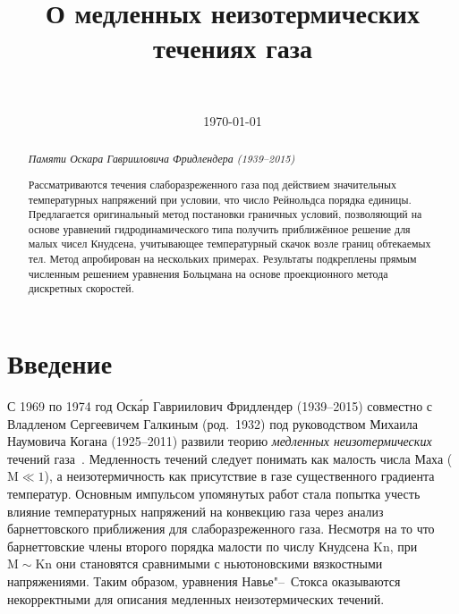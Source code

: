 \documentclass[
aps,%
12pt,%
final,%
notitlepage,%
oneside,%
onecolumn,%
nobibnotes,%
nofootinbib,%
superscriptaddress,%
noshowpacs,%
centertags]%
{revtex4}
\newcommand{\Kn}{\mathrm{Kn}}
\newcommand{\Ma}{\mathrm{M}}
\begin{document}

\title{О медленных неизотермических течениях газа}
\author{~}

\date{\today}

\begin{abstract}
    \begin{flushright}
    \vspace{1em}
    {\it Памяти Оскара Гаврииловича Фридлендера (1939--2015)}
    \vspace{1em}
    \end{flushright}
    Рассматриваются течения слаборазреженного газа
    под действием значительных температурных напряжений
    при условии, что число Рейнольдса порядка единицы.
    Предлагается оригинальный метод постановки граничных условий,
    позволяющий на основе уравнений гидродинамического типа
    получить приближённое решение для малых чисел Кнудсена,
    учитывающее температурный скачок возле границ обтекаемых тел.
    Метод апробирован на нескольких примерах.
    Результаты подкреплены прямым численным решением уравнения Больцмана
    на основе проекционного метода дискретных скоростей.
\end{abstract}


\maketitle

\section{Введение}

С 1969 по 1974 год Оск\'{а}р Гавриилович Фридлендер (1939--2015)
совместно с Владленом Сергеевичем Галкиным (род.~1932)
под руководством Михаила Наумовича Когана (1925--2011)
развили теорию \emph{медленных неизотермических}
течений газа~\cite{Kogan1970, Kogan1971, Kogan1972, Friedlander1974, Kogan1976}.
Медленность течений следует понимать как малость числа Маха (\(\Ma\ll1\)),
а неизотермичность как присутствие в газе существенного градиента температур.
Основным импульсом упомянутых работ стала попытка учесть влияние температурных напряжений
на конвекцию газа через анализ барнеттовского приближения для слаборазреженного газа.
Несмотря на то что барнеттовские члены второго порядка малости по числу Кнудсена \(\Kn\),
при \(\Ma\sim\Kn\) они становятся сравнимыми с ньютоновскими вязкостными напряжениями.
Таким образом, уравнения Навье"--~Стокса оказываются некорректными для
описания медленных неизотермических течений.
\end{document}
